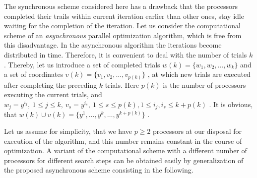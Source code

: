 The synchronous scheme considered here has a drawback that the processors completed their trails within current iteration earlier than other ones, stay idle waiting for the completion of the iteration. Let us consider the computational scheme of an \textit{asynchronous} parallel optimization algorithm, which is free from this disadvantage. In the asynchronous algorithm the iterations become distributed in time. Therefore, it is convenient to deal with the number of trials $k$. Thereby, let us introduce a set of completed trials  $w(k)=\{w_1,w_2,\ldots,w_k\}$  and a set  of coordinates $v(k)=\{v_1,v_2,\ldots,v_{p(k)}\}$ , at which new trials are executed after completing the preceding $k$ trials. Here $p(k)$ is the number of processors executing the current trials, and $w_j=y^{i_j},\ 1\leq j\leq k,\ v_s=y^{i_s},\ 1\leq s\leq p(k), 1\leq i_j,i_s \leq k+p(k)$ . It is obvious, that $w(k)\cup v(k)=\{y^1,\ldots,y^k,\ldots,y^{k+p(k)}\}$ .

Let us assume for simplicity, that we have  $p\geq 2$  processors at our disposal for execution of the algorithm, and this number remains constant in the course of optimization. A variant of the computational scheme with a different number of processors for different search steps can be obtained easily by generalization of the proposed asynchronous scheme consisting in the following.
